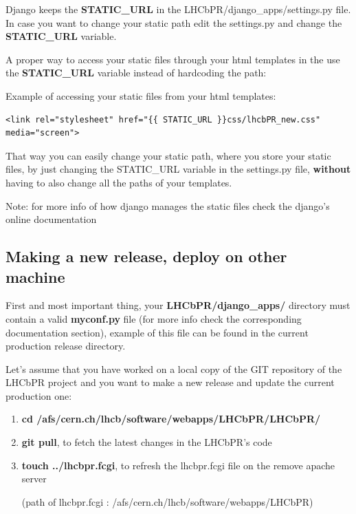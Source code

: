 \documentclass{lhcbnote}
\begin{document}
Django keeps the {\bf STATIC\_URL} in the LHCbPR/django\_apps/settings.py file.
In case you want to change your static path edit the settings.py and change the {\bf STATIC\_URL} variable.

\vspace {2mm}

A proper way to access your static files through your html templates in the use the {\bf STATIC\_URL} variable instead of hardcoding the path:

Example of accessing your static files from your html templates:
\begin{verbatim}
<link rel="stylesheet" href="{{ STATIC_URL }}css/lhcbPR_new.css" media="screen">
\end{verbatim} 

That way you can easily change your static path, where you store your static files, by just changing the STATIC\_URL variable in the settings.py file, {\bf without} having to also change 
all the paths of your templates.

\vspace{3mm}
Note: for more info of how django manages the static files check the django's online documentation

\subsection {Making a new release, deploy on other machine}

First and most important thing, your {\bf LHCbPR/django\_apps/} directory must contain a valid {\bf myconf.py} file 
(for more info check the corresponding documentation section), example of this file can be found in the current production release directory.

Let's assume that you have worked on a local copy of the GIT repository of the LHCbPR project and you want to 
make a new release and update the current production one:

\begin{enumerate}
\item
{\bf cd /afs/cern.ch/lhcb/software/webapps/LHCbPR/LHCbPR/}
\item
{\bf git pull}, to fetch the latest changes in the LHCbPR's code
\item

{\bf touch ../lhcbpr.fcgi}, to refresh the lhcbpr.fcgi file on the remove apache server 

(path of lhcbpr.fcgi : /afs/cern.ch/lhcb/software/webapps/LHCbPR)
\end{enumerate}
\end{document}

